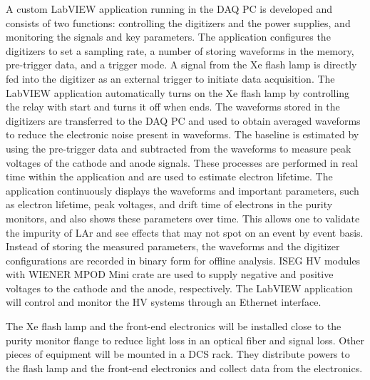 A custom LabVIEW application running in the DAQ PC is developed and consists of two functions: controlling the digitizers and the power supplies, and monitoring the signals and key parameters. The application configures the digitizers to set a sampling rate, a number of storing waveforms in the memory, pre-trigger data, and a trigger mode. A signal from the Xe flash lamp is directly fed into the digitizer as an external trigger to initiate data acquisition. The LabVIEW application automatically turns on the Xe flash lamp by controlling the relay with start and turns it off when ends. The waveforms stored in the digitizers are transferred to the DAQ PC and used to obtain averaged waveforms to reduce the electronic noise present in waveforms. The baseline is estimated by using the pre-trigger data and subtracted from the waveforms to measure peak voltages of the cathode and anode signals. These processes are performed in real time within the application and are used to estimate electron lifetime. The application continuously displays the waveforms and important parameters, such as electron lifetime, peak voltages, and drift time of electrons in the purity monitors, and also shows these parameters over time. This allows one to validate the impurity of LAr and see effects that may not spot on an event by event basis. Instead of storing the measured parameters, the waveforms and the digitizer configurations are recorded in binary form for offline analysis. ISEG HV modules with WIENER MPOD Mini crate are used to supply negative and positive voltages to the cathode and the anode, respectively. The LabVIEW application will control and monitor the HV systems through an Ethernet interface.  

The Xe flash lamp and the front-end electronics will be installed close to the purity monitor flange to reduce light loss in an optical fiber and signal loss. Other pieces of equipment will be mounted in a DCS rack. They distribute powers to the flash lamp and the front-end electronics and collect data from the electronics.




